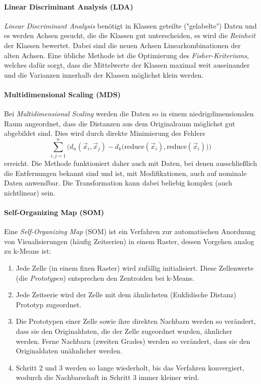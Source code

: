				\paragraph{Linear Discriminant Analysis (LDA)}
					\emph{Linear Discriminant Analysis} benötigt in Klassen geteilte ("gelabelte") Daten und es werden Achsen gesucht, die die Klassen gut unterscheiden, \dh es wird die \emph{Reinheit} der Klassen bewertet. Dabei sind die neuen Achsen Linearkombinationen der alten Achsen. Eine übliche Methode ist die Optimierung des \emph{Fisher-Kriteriums}, welches dafür sorgt, dass die Mittelwerte der Klassen maximal weit auseinander und die Varianzen innerhalb der Klassen möglichst klein werden.

				\paragraph{Multidimensional Scaling (MDS)}
					Bei \emph{Multidimensional Scaling} werden die Daten so in einem niedrigdimensionalen Raum angeordnet, dass die Distanzen aus dem Originalraum möglichst gut abgebildet sind. Dies wird durch direkte Minimierung des Fehlers
					\begin{equation}
						\sum_{i, j = 1}^{n} \bigl( d_n(\vec{x}_i, \vec{x}_j) - d_k\bigl( \mathrm{reduce}(\vec{x}_i), \mathrm{reduce}(\vec{x}_i) \bigr) \bigr)
					\end{equation}
					erreicht. Die Methode funktioniert daher auch mit Daten, bei denen ausschließlich die Entfernungen bekannt sind und ist, mit Modifikationen, auch auf nominale Daten anwendbar. Die Transformation kann dabei beliebig komplex (auch nichtlinear) sein.

				\paragraph{Self-Organizing Map (SOM)}
					\label{p:som}

					Eine \emph{Self-Organizing Map} (SOM) ist ein Verfahren zur automatischen Anordnung von Visualisierungen (häufig Zeitserien) in einem Raster, dessen Vorgehen analog zu k-Means ist:
					\begin{enumerate}
						\item Jede Zelle (in einem fixen Raster) wird zufällig initialisiert. Diese Zellenwerte (die \emph{Prototypen}) entsprechen den Zentroiden bei k-Means.
						\item Jede Zeitserie wird der Zelle mit dem ähnlichsten (\bspw Euklidische Distanz) Prototyp zugeordnet.
						\item Die Prototypen einer Zelle sowie ihre direkten Nachbarn werden so verändert, dass sie den Originaldaten, die der Zelle zugeordnet wurden, ähnlicher werden. Ferne Nachbarn (zweiten Grades) werden so verändert, dass sie den Originaldaten unähnlicher werden.
						\item Schritt 2 und 3 werden so lange wiederholt, bis das Verfahren konvergiert, wodurch die Nachbarschaft in Schritt 3 immer kleiner wird.
					\end{enumerate}


